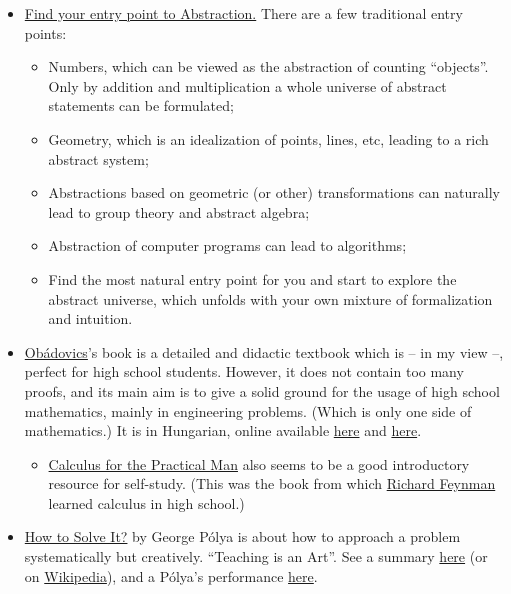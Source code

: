 \documentclass{article}
\begin{document}
\begin{itemize}
    \item \underline{Find your entry point to Abstraction.}
    There are a few traditional entry points:
    \begin{itemize}
        \item Numbers, which can be viewed as the abstraction of counting ``objects''. Only by addition and multiplication a whole universe of abstract statements can be formulated;
        \item Geometry, which is an idealization of points, lines, etc, leading to a rich abstract system;
        \item Abstractions based on geometric (or other) transformations can naturally lead to group theory and abstract algebra;
        \item Abstraction of computer programs can lead to algorithms;
        \item Find the most natural entry point for you and start to explore the abstract universe, which unfolds with your own mixture of formalization and intuition.
    \end{itemize}

    \item \href{https://moly.hu/konyvek/obadovics-j-gyula-matematika}{Obádovics}'s book is a detailed and didactic textbook which is -- in my view --, perfect for high school students. However, it does not contain too many proofs, and its main aim is to give a solid ground for the usage of high school mathematics, mainly in engineering problems. (Which is only one side of mathematics.) It is in Hungarian, online available \href{https://www.scribd.com/document/351926211/Obadovics-J-Gyula-Matematika-pdf}{here} and \href{https://datagrid.hu/boda/Boda-sajat/Rush/Matek/obadovics_matematika.pdf}{here}.
    \begin{itemize}
        \item \href{https://archive.org/details/calulusforthepra000526mbp}{Calculus for the Practical Man} also seems to be a good introductory resource for self-study. (This was the book from which \href{https://abakcus.com/article/richard-feynmans-notebook/}{Richard Feynman} learned calculus in high school.) 
    \end{itemize}

    \item \href{https://www.goodreads.com/book/show/192221.How_to_Solve_It}{How to Solve It?} by George Pólya is about how to approach a problem systematically but creatively. ``Teaching is an Art''. See a summary \href{https://web.archive.org/web/20240406172342/https://math.berkeley.edu/~gmelvin/polya.pdf}{here} (or on \href{https://en.wikipedia.org/wiki/How_to_Solve_It}{Wikipedia}), and a Pólya's performance \href{https://www.youtube.com/watch?v=h0gbw-Ur_do}{here}.
    

\end{itemize}
\end{document}
